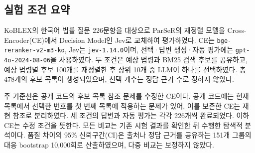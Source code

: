 \subsection{실험 조건 요약}

\label{sec:ch4_1}

KoBLEX의 한국어 법률 질문 226문항을 대상으로 ParSeR의 재정렬 모델을 Cross-Encoder(CE)에서 Decision Model인 Jev로 교체하여 평가하였다. CE는 \texttt{bge-reranker-v2-m3-ko}, Jev는 \texttt{jev-1.14.0}이며, 선택·답변 생성·자동 평가에는 \texttt{gpt-4o-2024-08-06}을 사용하였다. 두 조건은 예상 법령과 BM25 검색 후보를 공유하고, 예상 법령별 후보 100개를 재정렬한 후 상위 10개 중 LLM이 하나를 선택하였다. 총 478개의 후보 목록이 생성되었으며, 선택 개수는 정답 근거 수로 정하지 않았다.

주 기준선은 공개 코드의 후보 목록 참조 문제를 수정한 CE이다. 공개 코드에는 현재 목록에서 선택한 번호를 첫 번째 목록에 적용하는 문제가 있어, 이를 보존한 CE는 재현 참조로 분리하였다. 세 조건의 답변과 자동 평가는 각각 226개씩 완료되었다. 이하 CE는 수정 조건을 뜻한다. 모든 비교는 기존 시험 결과를 확인한 뒤 수행한 탐색적 분석이다. 품질 차이의 95\% 신뢰구간(CI)은 출처나 정답 근거를 공유하는 151개 그룹의 대응 bootstrap 10,000회로 산출하였으며, 다중 비교는 보정하지 않았다.

